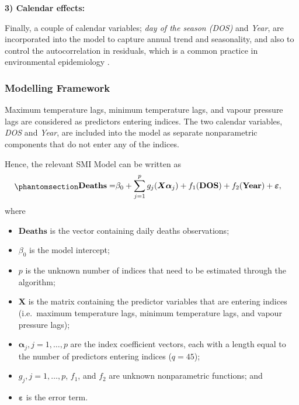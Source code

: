 \documentclass[
  11pt,
  a4paper,
]{article}
\providecommand{\tightlist}{%
  \setlength{\itemsep}{0pt}\setlength{\parskip}{0pt}}\usepackage{longtable,booktabs,array}
\begin{document}
\textbf{3) Calendar effects:}

Finally, a couple of calendar variables; \emph{day of the season (DOS)}
and \emph{Year}, are incorporated into the model to capture annual trend
and seasonality, and also to control the autocorrelation in residuals,
which is a common practice in environmental epidemiology
\autocite{Masselot2022}.

\subsubsection{Modelling Framework}\label{modelling-framework}

Maximum temperature lags, minimum temperature lags, and vapour pressure
lags are considered as predictors entering indices. The two calendar
variables, \emph{DOS} and \emph{Year}, are included into the model as
separate nonparametric components that do not enter any of the indices.

Hence, the relevant SMI Model can be written as
\begin{equation}\phantomsection\label{eq-heat}{
\begin{aligned}
  \textbf{Deaths} = & \beta_{0} + \sum_{j = 1}^{p}{g_{j}(\bm{X}\bm{\alpha}_{j})} + f_{1}(\textbf{DOS}) + f_{2}(\textbf{Year})+ \bm{\varepsilon},
\end{aligned}
}\end{equation} where

\begin{itemize}
\tightlist
\item
  \(\textbf{Deaths}\) is the vector containing daily deaths
  observations;
\item
  \(\beta_{0}\) is the model intercept;
\item
  \(p\) is the unknown number of indices that need to be estimated
  through the algorithm;
\item
  \(\bm{X}\) is the matrix containing the predictor variables that are
  entering indices (i.e.~maximum temperature lags, minimum temperature
  lags, and vapour pressure lags);
\item
  \(\bm{\alpha}_{j}, j = 1, \dots, p\) are the index coefficient
  vectors, each with a length equal to the number of predictors entering
  indices (\(q=45\));
\item
  \(g_{j}, j = 1, \dots, p\), \(f_{1}\), and \(f_{2}\) are unknown
  nonparametric functions; and
\item
  \(\bm{\varepsilon}\) is the error term.
\end{itemize}
\end{document}
